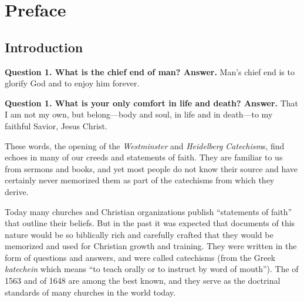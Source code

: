 \documentclass[00-main.tex]{subfiles}
\begin{document}
\frontmatter

\pagestyle{myPageStyle}

\part{Preface}

\chapter{Introduction}

\hspace{3ex}\textbf{Question 1. What is the chief end of man?\newline
Answer.} Man's chief end is to glorify God and to enjoy him forever.

\textbf{Question 1. What is your only comfort in life and death?\newline
Answer.} That I am not my own, but belong\thinspace{}---\thinspace{}body and soul, in life and in death\thinspace{}---\thinspace{}to my faithful Savior, Jesus Christ.

\smallskip

These words, the opening of the {\em Westminster\/} and {\em Heidelberg Catechism\/}s, find echoes in many of our creeds and statements of faith. They are familiar to us from sermons and books, and yet most people do not know their source and have certainly never memorized them as part of the catechisms from which they derive.

Today many churches and Christian organizations publish ``statements of faith'' that outline their beliefs. But in the past it was expected that documents of this nature would be so biblically rich and carefully crafted that they would be memorized and used for Christian growth and training. They were written in the form of questions and answers, and were called catechisms (from the Greek {\em katechein} which means ``to teach orally or to instruct by word of mouth''). The  of 1563 and  of 1648 are among the best known, and they serve as the doctrinal standards of many churches in the world today.
\end{document}

